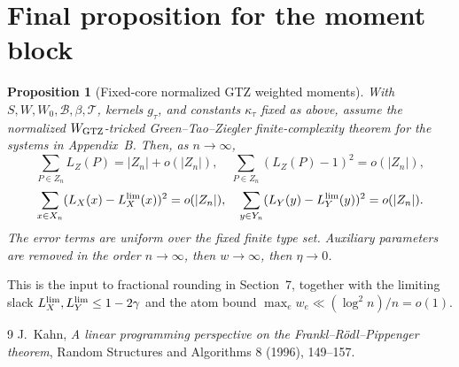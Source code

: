 \documentclass[11pt]{article}
\newtheorem{proposition}[theorem]{Proposition}
\newcommand{\B}{\mathcal B}
\begin{document}
\section{Final proposition for the moment block}

\begin{proposition}[Fixed-core normalized GTZ weighted moments]\label{prop:F1}
With \(S,W,W_0,\B,\beta,\mathcal T\), kernels \(g_\tau\), and constants
\(\kappa_\tau\) fixed as above, assume the normalized
\(W_{\rm GTZ}\)-tricked Green--Tao--Ziegler finite-complexity theorem for
the systems in Appendix~B.  Then, as \(n\to\infty\),
\[
  \sum_{P\in Z_n}L_Z(P)=|Z_n|+o(|Z_n|),
  \quad
  \sum_{P\in Z_n}(L_Z(P)-1)^2=o(|Z_n|),
\]
\[
  \sum_{x\in X_n}(L_X(x)-L_X^{\rm lim}(x))^2=o(|Z_n|),
  \quad
  \sum_{y\in Y_n}(L_Y(y)-L_Y^{\rm lim}(y))^2=o(|Z_n|).
\]
The error terms are uniform over the fixed finite type set.  Auxiliary
parameters are removed in the order \(n\to\infty\), then \(w\to\infty\), then
\(\eta\to0\).
\end{proposition}

This is the input to fractional rounding in Section~7, together with the
limiting slack \(L_X^{\rm lim},L_Y^{\rm lim}\le1-2\gamma\) and the atom bound
\(\max_e w_e\ll(\log^2 n)/n=o(1)\).

\begin{thebibliography}{9}
J.\ Kahn, \emph{A linear programming perspective on the
Frankl--R\"odl--Pippenger theorem}, Random Structures and Algorithms 8
(1996), 149--157.
\end{thebibliography}
\end{document}
